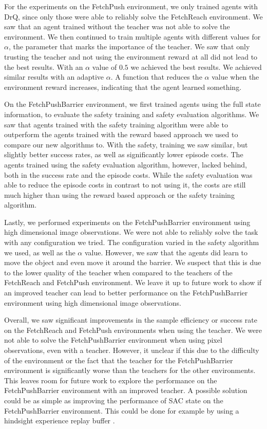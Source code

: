 For the experiments on the FetchPush environment, we only trained agents with DrQ, since only those were able to reliably solve the FetchReach environment. We saw that an agent trained without the teacher was not able to solve the environment. We then continued to train multiple agents with different values for $\alpha$, the parameter that marks the importance of the teacher. We saw that only trusting the teacher and not using the environment reward at all did not lead to the best results. With an $\alpha$ value of $0.5$ we achieved the best results. We achieved similar results with an adaptive $\alpha$. A function that reduces the $\alpha$ value when the environment reward increases, indicating that the agent learned something.

On the FetchPushBarrier environment, we first trained agents using the full state information, to evaluate the safety training and safety evaluation algorithms. We saw that agents trained with the safety training algorithm were able to outperform the agents trained with the reward based approach we used to compare our new algorithms to. With the safety, training we saw similar, but slightly better success rates, as well as significantly lower episode costs. The agents trained using the safety evaluation algorithm, however, lacked behind, both in the success rate and the episode costs. While the safety evaluation was able to reduce the episode costs in contrast to not using it, the costs are still much higher than using the reward based approach or the safety training algorithm.

Lastly, we performed experiments on the FetchPushBarrier environment using high dimensional image observations. We were not able to reliably solve the task with any configuration we tried. The configuration varied in the safety algorithm we used, as well as the $\alpha$ value. However, we saw that the agents did learn to move the object and even move it around the barrier. We suspect that this is due to the lower quality of the teacher when compared to the teachers of the FetchReach and FetchPush environment. We leave it up to future work to show if an improved teacher can lead to better performance on the FetchPushBarrier environment using high dimensional image observations.

Overall, we saw significant improvements in the sample efficiency or success rate on the FetchReach and FetchPush environments when using the teacher. We were not able to solve the FetchPushBarrier environment when using pixel observations, even with a teacher. However, it unclear if this due to the difficulty of the environment or the fact that the teacher for the FetchPushBarrier environment is significantly worse than the teachers for the other environments. This leaves room for future work to explore the performance on the FetchPushBarrier environment with an improved teacher. A possible solution could be as simple as improving the performance of SAC state on the FetchPushBarrier environment. This could be done for example by using a hindsight experience replay buffer \cite{andrychowiczHindsightExperienceReplay2018}.

